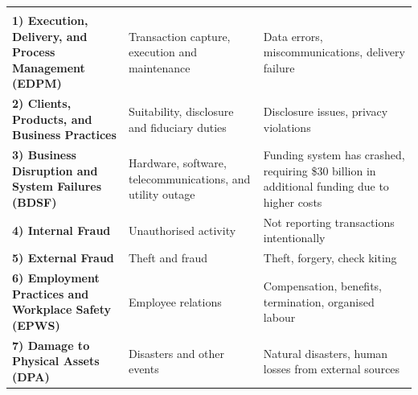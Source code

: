\noindent\begin{minipage}{\textwidth}
\renewcommand{\arraystretch}{1.3}
\begin{tabularx}{\textwidth}{@{}L{0.28\textwidth}L{0.30\textwidth}Y@{}}
  &  & \\
{\tabfont \textbf{1) Execution, Delivery, and Process Management (EDPM)}} &
{\tabfont Transaction capture, execution and maintenance} &
{\tabfont Data errors, miscommunications, delivery failure}\\
{\tabfont \textbf{2) Clients, Products, and Business Practices}} &
{\tabfont Suitability, disclosure and fiduciary duties} &
{\tabfont Disclosure issues, privacy violations}\\
{\tabfont \textbf{3) Business Disruption and System Failures (BDSF)}} &
{\tabfont Hardware, software, telecommunications, and utility outage} &
{\tabfont Funding system has crashed, requiring \$30 billion in additional
 funding due to higher costs}\\
{\tabfont \textbf{4) Internal Fraud}} &
{\tabfont Unauthorised activity} &
{\tabfont Not reporting transactions intentionally}\\
{\tabfont \textbf{5) External Fraud}} &
{\tabfont Theft and fraud} &
{\tabfont Theft, forgery, check kiting}\\
{\tabfont \textbf{6) Employment Practices and Workplace Safety (EPWS)}} &
{\tabfont Employee relations} &
{\tabfont Compensation, benefits, termination, organised labour}\\
{\tabfont \textbf{7) Damage to Physical Assets (DPA)}} &
{\tabfont Disasters and other events} &
{\tabfont Natural disasters, human losses from external sources}\\
\end{tabularx}
\end{minipage}


